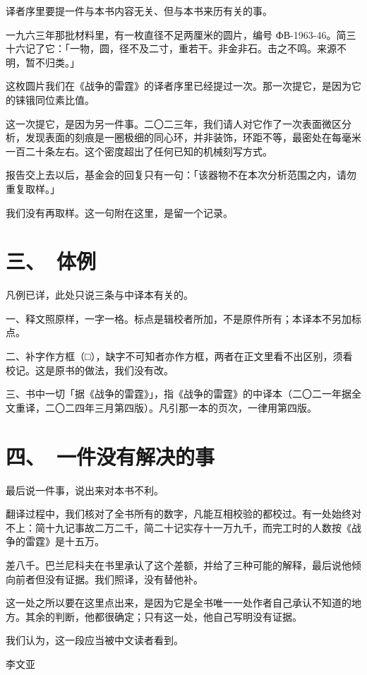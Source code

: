 译者序里要提一件与本书内容无关、但与本书来历有关的事。

一九六三年那批材料里，有一枚直径不足两厘米的圆片，编号 ФВ-1963-46\nobreak。简三十六记了它：「一物，圆，径不及二寸，重若干。非金非石。击之不鸣。来源不明，暂不归类。」

这枚圆片我们在《战争的雷霆》的译者序里已经提过一次。那一次提它，是因为它的铼锇同位素比值。

这一次提它，是因为另一件事。二〇二三年，我们请人对它作了一次表面微区分析，发现表面的刻痕是一圈极细的同心环，并非装饰，环距不等，最密处在每毫米一百二十条左右。这个密度超出了任何已知的机械刻写方式。

报告交上去以后，基金会的回复只有一句：「该器物不在本次分析范围之内，请勿重复取样。」

我们没有再取样。这一句附在这里，是留一个记录。

\section*{三、\ 体例}

凡例已详，此处只说三条与中译本有关的。

一、释文照原样，一字一格。标点是辑校者所加，不是原件所有；本译本不另加标点。

二、补字作方框（□），缺字不可知者亦作方框，两者在正文里看不出区别，须看校记。这是原书的做法，我们没有改。

三、书中一切「据《战争的雷霆》」，指《战争的雷霆》的中译本（二〇二一年据全文重译，二〇二四年三月第四版）。凡引那一本的页次，一律用第四版。

\section*{四、\ 一件没有解决的事}

最后说一件事，说出来对本书不利。

翻译过程中，我们核对了全书所有的数字，凡能互相校验的都校过。有一处始终对不上：简十九记事故二万二千，简二十记实存十一万九千，而完工时的人数按《战争的雷霆》是十五万。

差八千。巴兰尼科夫在书里承认了这个差额，并给了三种可能的解释，最后说他倾向前者但没有证据。我们照译，没有替他补。

这一处之所以要在这里点出来，是因为它是全书唯一一处作者自己承认不知道的地方。其余的判断，他都很确定；只有这一处，他自己写明没有证据。

我们认为，这一段应当被中文读者看到。

\begin{flushright}
{\small 李文亚}
\end{flushright}

